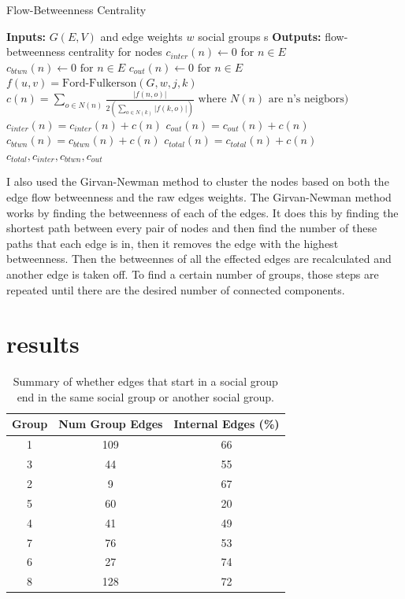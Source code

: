 \documentclass{sig-alternate-05-2015}
\begin{document}
\begin{algorithm}[t]
\caption{Flow-Betweenness Centrality}
\label{FBC}
\begin{algorithmic}
\STATE \textbf{Inputs:} $G(E,V)$ and edge weights $w$ social groups s
\STATE \textbf{Outputs:} flow-betweenness centrality for nodes
\STATE $c_{inter}(n) \leftarrow 0 \text{ for } n \in E$
\STATE $c_{btwn}(n) \leftarrow 0 \text{ for } n \in E$
\STATE $c_{out}(n) \leftarrow 0 \text{ for } n \in E$
\STATE $ f(u,v) = \text{Ford-Fulkerson} (G,w,j,k)$
\STATE $c(n) = \sum_{o \in N(n)}\frac{| f(n,o)|}{2 (\sum_{o \in N(k)}|f(k,o)|)} \text{ where } N(n) \text{ are n's neigbors} )$
\STATE $c_{inter}(n) = c_{inter}(n) + c(n)$
\STATE $c_{out}(n) = c_{out}(n) + c(n)$
\ELSE 
\STATE $c_{btwn}(n) = c_{btwn}(n) + c(n)$
\ENDIF
\STATE $c_{total}(n) = c_{total}(n) + c(n)$
\ENDFOR
\ENDFOR
\ENDFOR
\RETURN $c_{total}, c_{inter}, c_{btwn}, c_{out}$
\end{algorithmic}
\end{algorithm}




I also used the Girvan-Newman method to cluster the nodes based on both the edge flow betweenness and the raw edges weights.  The Girvan-Newman method works by finding the betweenness of each of the edges.  It does this by finding the shortest path between every pair of nodes and then find the number of these paths that each edge is in, then it removes the edge with the highest betweenness.  Then the betweennes of all the effected edges are recalculated and another edge is taken off.  To find a certain number of groups, those steps are repeated until there are the desired number of connected components.

\section{results}

\begin{table}[b]
\centering
\label{table}
\caption{Summary of whether edges that start in a social group end in the same social group or another social group.}
\begin{tabular}{| c | c | c  | }
\hline
Group & Num Group Edges &  Internal Edges (\%)\\
\hline
1 & 109 & 66 \\
\hline
3 & 44 & 55 \\
\hline
2 & 9 & 67 \\
\hline
5 & 60 & 20 \\
\hline
4 & 41 & 49 \\
\hline
7 & 76 & 53 \\
\hline
6 & 27 & 74\\
\hline
8 & 128 & 72\\
\hline
\end{tabular}
\end{table}
\end{document}
